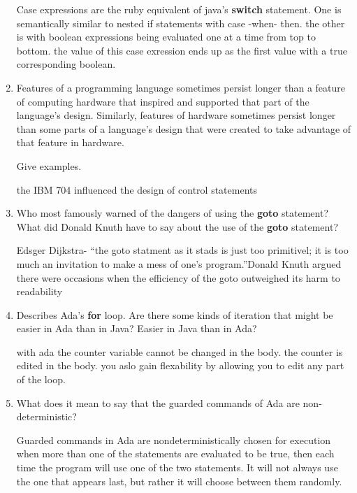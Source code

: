 \begin{enumerate}
    \begin{answer}
     Case expressions are the ruby equivalent of java's \textbf{switch} statement. One is semantically similar to  nested if statements with case -when- then. the other is with boolean expressions being evaluated one at a time from top to bottom.
     the value of this case exression ends up as the first value with a true corresponding boolean.
      
    \end{answer}

  \item Features of a programming language sometimes persist
    longer than a feature of computing hardware that inspired
    and supported that part of the language's design.
    Similarly, features of hardware sometimes persist longer
    than some parts of a language's design that were created
    to take advantage of that feature in hardware.

    Give examples.

    \begin{answer}
      the IBM 704 influenced the design of control statements
    \end{answer}

  \item Who most famously warned of the dangers of using the
    \textbf{goto} statement? What did Donald Knuth have to
    say about the use of the \textbf{goto} statement?

    \begin{answer}
      Edsger Dijkstra- ``the goto statment as it stads is just too primitivel; it is too much an invitation to make a mess of one's program.''Donald Knuth argued there were occasions when the efficiency of the goto outweighed its harm to readability
      \end{answer}

  \item Describes Ada's \textbf{for} loop. Are there some
    kinds of iteration that might be easier in Ada than
    in Java? Easier in Java than in Ada?

    \begin{answer}
      with ada the counter variable cannot be changed in the body. the counter is edited in the body. you aslo gain flexability by
      allowing you to edit any part of the loop.
    \end{answer}

  \item What does it mean to say that the guarded commands
    of Ada are non-deterministic?
    \begin{answer}
      Guarded commands in Ada are nondeterministically chosen for execution when
      more than one of the statements are evaluated to be true, then each time the
      program will use one of the two statements. It will not always use the one 
      that appears last, but rather it will choose between them randomly.
    \end{answer}


\end{enumerate}
